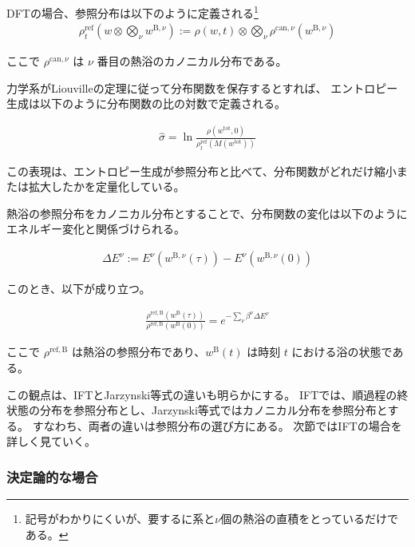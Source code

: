 \documentclass[a4paper,11pt]{jsarticle}
\numberwithin{equation}{section}
\begin{document}
DFTの場合、参照分布は以下のように定義される\footnote{記号がわかりにくいが、要するに系と$\nu$個の熱浴の直積をとっているだけである。}
\begin{align}
\rho_t^{\mathrm{ref}}\left(w \otimes \bigotimes_{\nu} w^{\mathrm{B}, \nu}\right)
:= \rho(w, t) \otimes \bigotimes_{\nu} \rho^{\mathrm{can}, \nu}(w^{\mathrm{B}, \nu})
\end{align}

ここで $\rho^{\mathrm{can}, \nu}$ は $\nu$ 番目の熱浴のカノニカル分布である。

力学系がLiouvilleの定理に従って分布関数を保存するとすれば、
エントロピー生成は以下のように分布関数の比の対数で定義される。

\begin{align}
\hat{\sigma} = \ln \frac{\rho(w^{\mathrm{tot}}, 0)}{\rho_t^{\mathrm{ref}}(M(w^{\mathrm{tot}}))}
\end{align}

この表現は、エントロピー生成が参照分布と比べて、分布関数がどれだけ縮小または拡大したかを定量化している。

熱浴の参照分布をカノニカル分布とすることで、分布関数の変化は以下のようにエネルギー変化と関係づけられる。

\begin{align}
\Delta E^{\nu} := E^{\nu}(w^{\mathrm{B}, \nu}(\tau)) - E^{\nu}(w^{\mathrm{B}, \nu}(0))
\end{align}

このとき、以下が成り立つ。

\begin{align}
\frac{\rho^{\mathrm{ref}, \mathrm{B}}(w^{\mathrm{B}}(\tau))}{\rho^{\mathrm{ref}, \mathrm{B}}(w^{\mathrm{B}}(0))}
= e^{-\sum_{\nu} \beta^{\nu} \Delta E^{\nu}}
\end{align}

ここで $\rho^{\mathrm{ref}, \mathrm{B}}$ は熱浴の参照分布であり、$w^{\mathrm{B}}(t)$ は時刻 $t$ における浴の状態である。

この観点は、IFTとJarzynski等式の違いも明らかにする。
IFTでは、順過程の終状態の分布を参照分布とし、Jarzynski等式ではカノニカル分布を参照分布とする。
すなわち、両者の違いは参照分布の選び方にある。
次節ではIFTの場合を詳しく見ていく。


\subsubsection{決定論的な場合}
\end{document}
